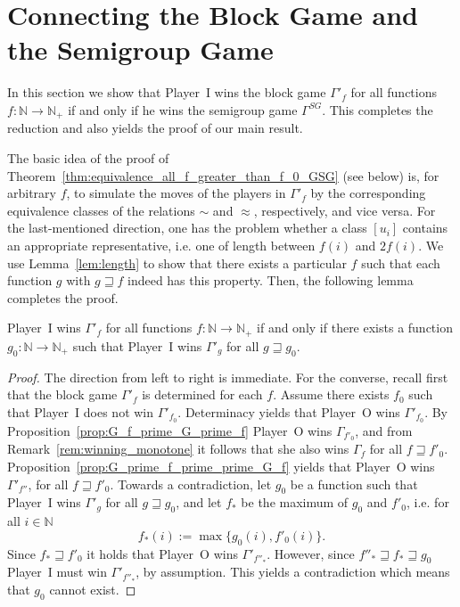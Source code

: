 \documentclass[fleqn,envcountsame]{LMCS}
\newcommand{\pI}{Player~I\xspace}
\newcommand{\pO}{Player~O\xspace}
\newcommand{\GSG}{\ensuremath{\Gamma^{SG}}\xspace}
\newcommand{\Gd}[1]{\ensuremath{\Gamma_{#1}}\xspace}
\newcommand{\Gp}[1]{\ensuremath{\Gamma'_{#1}}\xspace}
\newcommand{\Nat}{\ensuremath{\mathbb{N}}\xspace}
\newcommand{\Natp}{\ensuremath{\mathbb{N}_+}\xspace}
\newcommand{\ie}{i.e.\xspace}
\begin{document}
\section{Connecting the Block Game and the Semigroup Game}\label{sec:connection_block_semigroup_game}
In this section we show that \pI wins the block game \Gp{f} for all
functions $f:\Nat\to\Natp$ if and only if he wins the semigroup game \GSG.
This completes the reduction and also yields the proof of our main result.

The basic idea of the proof of Theorem~\ref{thm:equivalence_all_f_greater_than_f_0_GSG} (see below)
is, for arbitrary $f$, to simulate the moves of the players in \Gp{f} by the corresponding
equivalence classes of the relations $\sim$ and $\approx$, respectively, and vice versa.
For the last-mentioned direction,
one has the problem whether a class $[u_i]$ contains an
appropriate representative, \ie one of length between $f(i)$ and $2f(i)$.
We use Lemma~\ref{lem:length} to show that there exists a particular $f$
such that each function $g$ with $g\sqsupseteq f$ indeed has this property.
Then, the following lemma completes the proof.

\begin{lem}\label{lem:equivalence_all_f_all_f_greater_than_f_0}
\pI wins \Gp{f} for all functions $f:\Nat\to\Natp$ if and only if there exists
a function $g_0 : \Nat \to \Natp$ such that \pI wins \Gp{g} for
all $g\sqsupseteq g_0$.
\end{lem}
\begin{proof}
The direction from left to right is immediate. For the converse,
recall first that the block game \Gp{f} is determined for each $f$.
Assume there exists $f_0$ such that \pI does not win \Gp{f_0}.
Determinacy yields that \pO wins \Gp{f_0}.
By Proposition~\ref{prop:G_f_prime_G_prime_f} \pO wins \Gd{f'_0}, and
from Remark~\ref{rem:winning_monotone} it follows that she also wins \Gd{f} for
all $f\sqsupseteq f'_0$. Proposition~\ref{prop:G_prime_f_prime_prime_G_f}
yields that \pO wins \Gp{f''}, for all $f\sqsupseteq f'_0$. Towards
a contradiction, let $g_0$ be a function such that \pI wins \Gp{g} for
all $g\sqsupseteq g_0$, and let $f_*$ be the maximum of $g_0$ and
$f'_0$, \ie for all $i\in\Nat$
  \[ f_*(i):=\max\{g_0(i),f'_0(i)\}. \]
Since $f_*\sqsupseteq f'_0$ it holds that \pO wins
\Gp{f''_*}. However, since $f''_*\sqsupseteq f_*\sqsupseteq g_0$ \pI
must win \Gp{f''_*}, by assumption. This yields a contradiction which
means that $g_0$ cannot exist.
\end{proof}
\end{document}
